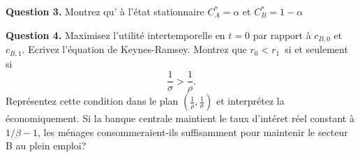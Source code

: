 \documentclass[11pt,a4paper]{article}
\begin{document}
\bigskip 

\textbf{Question 3. }  Montrez qu' \`{a} l'\'{e}tat stationnaire  $C_A^{\ast}=\alpha$ et $C_B^{\ast}=1-\alpha$

\bigskip 

%
%
\bigskip 

\textbf{Question 4. } Maximisez l'utilit\'{e} intertemporelle en $t=0$ par rapport \`{a} $c_{B,0}$ et $c_{B,1}$. Ecrivez l'\'{e}quation de Keynes-Ramsey.  Montrez que $r_{0}<r_{1}$\ si et seulement si%
\[
\frac{1}{\sigma }>\frac{1}{\rho }.
\]%
Repr\'{e}sentez cette condition dans le plan $\left( \frac{1}{\rho },\frac{1%
}{\sigma }\right) $ et interpr\'{e}tez la \'{e}conomiquement. Si  la banque centrale maintient le taux d'int\'{e}ret r\'{e}el constant \`{a} $ 1/\beta-1 $, les m\'{e}nages consommeraient-ils suffisamment pour maintenir le secteur B au plein emploi?


\end{document}
